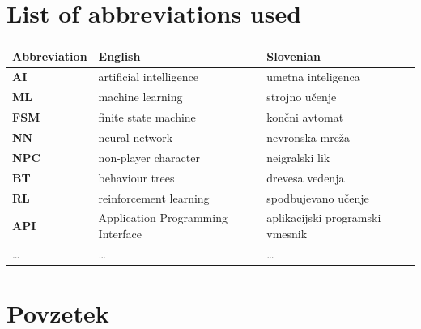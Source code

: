\documentclass[a4paper, 12pt]{book}
\newcommand{\clearemptydoublepage}{\newpage{\pagestyle{empty}\cleardoublepage}}
\begin{document}
\chapter*{List of abbreviations used}  %

\noindent\begin{tabular}{p{}|p{}|p{}}    %
  {\bf Abbreviation} & {\bf English} & {\bf Slovenian} \\ \hline
  {\bf AI}      & artificial intelligence           & umetna inteligenca \\
  {\bf ML}      & machine learning                  & strojno učenje \\
  {\bf FSM}     & finite state machine              & končni avtomat \\
  {\bf NN}      & neural network                    & nevronska mreža \\
  {\bf NPC}     & non-player character              & neigralski lik \\
  {\bf BT }     & behaviour trees                   & drevesa vedenja \\
  {\bf RL }     & reinforcement learning            & spodbujevano učenje \\
  {\bf API }    & Application Programming Interface & aplikacijski programski vmesnik \\
  \dots         & \dots                             & \dots \\
\end{tabular}

\clearemptydoublepage


\chapter*{Povzetek}
\end{document}
